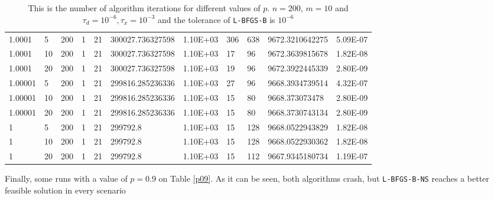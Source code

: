 \begin{table}
\begin{center}
\begin{tabular}{|l|l|l|l|l|l|l|l|l|l|l|}
      1.0001 & 5 & 200 &  1 & 21 & 300027.736327598 & 1.10E+03 & 306 & 638 & 9672.3210642275 & 5.09E-07\\
      1.0001 & 10 & 200 &  1 & 21 & 300027.736327598 & 1.10E+03 & 17 & 96 & 9672.3639815678 & 1.82E-08\\
      1.0001 & 20 & 200 &  1 & 21 & 300027.736327598 & 1.10E+03 & 19 & 96 & 9672.3922445339 & 2.80E-09\\
      1.00001 & 5 & 200 &  1 & 21 & 299816.285236336 & 1.10E+03 & 27 & 96 & 9668.3934739514 & 4.32E-07\\
      1.00001 & 10 & 200 &  1 & 21 & 299816.285236336 & 1.10E+03 & 15 & 80 & 9668.373073478 & 2.80E-09\\
      1.00001 & 20 & 200 &  1 & 21 & 299816.285236336 & 1.10E+03 & 15 & 80 & 9668.3730743134 & 2.80E-09\\
      1 & 5 & 200 & 1 &  21  & 299792.8 & 1.10E+03 & 15 & 128 & 9668.0522943829 & 1.82E-08\\
      1 & 10 & 200 & 1 &  21 & 299792.8 & 1.10E+03 & 15 & 128 & 9668.0522930362 & 1.82E-08\\
      1 & 20 & 200 & 1 &  21 & 299792.8 & 1.10E+03 & 15 & 112 & 9667.9345180734 & 1.19E-07\\
      \hline
    \end{tabular}
    \caption[Number of algorithm Iterations Changing $p$]{This is the number of algorithm iterations for different values of $p$. $n = 200$, $m = 10$ and $\tau_d = 10^{-6}, \tau_x = 10^{-3}$ and the tolerance of \texttt{L-BFGS-B} is $10^{-6}$ }
    \label{pmtable}
  \end{center}
\end{table}

Finally, some runs with a value of $p = 0.9$ on Table \ref{p09}. As it can be seen, both algorithms crash, but \texttt{L-BFGS-B-NS} reaches a better feasible solution in every scenario

